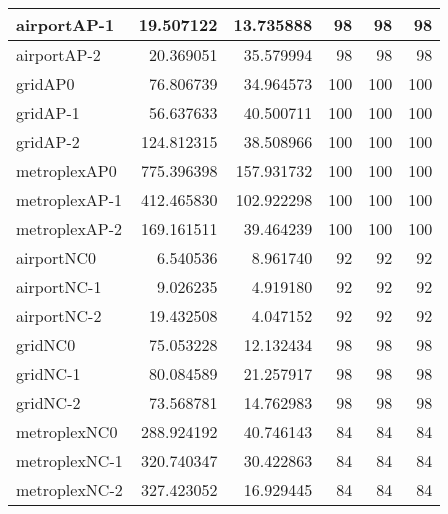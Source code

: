 \begin{longtable}{|l|r|r|r|r|r|}
airportAP-1 & 19.507122 & 13.735888 & 98 & 98 & 98 \\ \hline
airportAP-2 & 20.369051 & 35.579994 & 98 & 98 & 98 \\ \hline
gridAP0 & 76.806739 & 34.964573 & 100 & 100 & 100 \\ \hline
gridAP-1 & 56.637633 & 40.500711 & 100 & 100 & 100 \\ \hline
gridAP-2 & 124.812315 & 38.508966 & 100 & 100 & 100 \\ \hline
metroplexAP0 & 775.396398 & 157.931732 & 100 & 100 & 100 \\ \hline
metroplexAP-1 & 412.465830 & 102.922298 & 100 & 100 & 100 \\ \hline
metroplexAP-2 & 169.161511 & 39.464239 & 100 & 100 & 100 \\ \hline
airportNC0 & 6.540536 & 8.961740 & 92 & 92 & 92 \\ \hline
airportNC-1 & 9.026235 & 4.919180 & 92 & 92 & 92 \\ \hline
airportNC-2 & 19.432508 & 4.047152 & 92 & 92 & 92 \\ \hline
gridNC0 & 75.053228 & 12.132434 & 98 & 98 & 98 \\ \hline
gridNC-1 & 80.084589 & 21.257917 & 98 & 98 & 98 \\ \hline
gridNC-2 & 73.568781 & 14.762983 & 98 & 98 & 98 \\ \hline
metroplexNC0 & 288.924192 & 40.746143 & 84 & 84 & 84 \\ \hline
metroplexNC-1 & 320.740347 & 30.422863 & 84 & 84 & 84 \\ \hline
metroplexNC-2 & 327.423052 & 16.929445 & 84 & 84 & 84 \\ \hline
\end{longtable}
